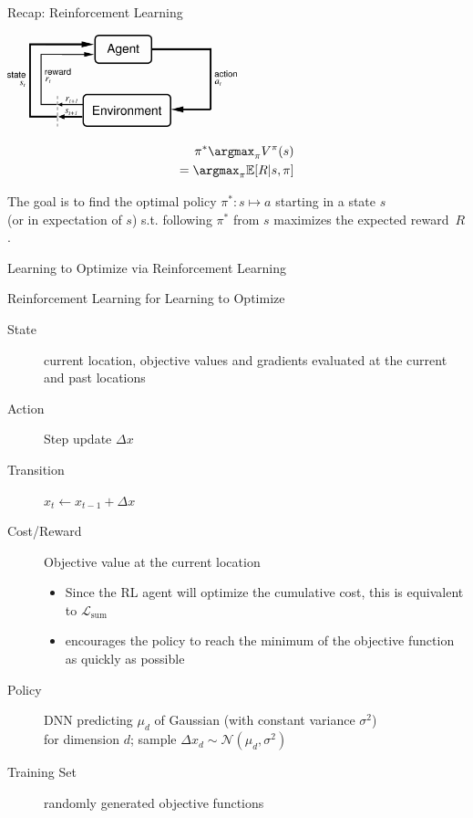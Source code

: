 \begin{frame}[c]{Recap: Reinforcement Learning }

\begin{center}
\includegraphics[width=0.5\textwidth]{images/suttonbarto_rl.png}
\end{center}

\pause

\begin{eqnarray}
\pi^* \argmax_{\pi} V^{\pi} (s)  \nonumber\\
= \argmax_{\pi} \mathbb{E}[R | s, \pi] \nonumber
\end{eqnarray}

The goal is to find the optimal policy $\pi^{*}: s \mapsto a$ starting in a state $s$\\ (or in expectation of $s$) s.t. following $\pi^{*}$ from $s$ maximizes the expected reward~$R$.


\end{frame}
\begin{frame}[c]{Learning to Optimize via Reinforcement Learning\newline {}}

\begin{block}{Reinforcement Learning for Learning to Optimize}
\begin{description}
\item[State] current location, objective values and gradients evaluated at the current and past locations
\pause
\item[Action] Step update $\Delta x$
\pause
\item[Transition] $x_t \leftarrow x_{t-1} + \Delta x$
\pause
\item[Cost/Reward] Objective value at the current location
\begin{itemize}
\item Since the RL agent will optimize the cumulative cost, this is equivalent to $\mathcal{L}_{\text{sum}}$
\item encourages the policy to reach the minimum of the objective function as quickly as possible
\end{itemize}
\pause
\item[Policy] DNN predicting $\mu_d$ of Gaussian (with constant variance $\sigma^2$)\\ for dimension $d$; sample $\Delta x_d \sim \mathcal{N}(\mu_d, \sigma^2)$
\pause
\item[Training Set] randomly generated objective functions
\end{description}
\end{block}

\end{frame}
